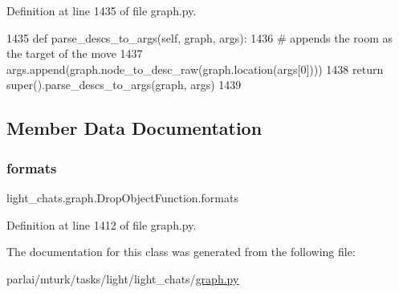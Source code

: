 Definition at line 1435 of file graph.\+py.


\begin{DoxyCode}
1435     \textcolor{keyword}{def }parse\_descs\_to\_args(self, graph, args):
1436         \textcolor{comment}{# appends the room as the target of the move}
1437         args.append(graph.node\_to\_desc\_raw(graph.location(args[0])))
1438         \textcolor{keywordflow}{return} super().parse\_descs\_to\_args(graph, args)
1439 
\end{DoxyCode}


\subsection{Member Data Documentation}
\mbox{\label{classlight__chats_1_1graph_1_1DropObjectFunction_a48f4d8c91a80deffb09e8a86c7f51e82}} 
\subsubsection{\texorpdfstring{formats}{formats}}
{\footnotesize\ttfamily light\+\_\+chats.\+graph.\+Drop\+Object\+Function.\+formats}



Definition at line 1412 of file graph.\+py.



The documentation for this class was generated from the following file\+:\begin{DoxyCompactItemize}
\item 
parlai/mturk/tasks/light/light\+\_\+chats/\hyperlink{parlai_2mturk_2tasks_2light_2light__chats_2graph_8py}{graph.\+py}\end{DoxyCompactItemize}
